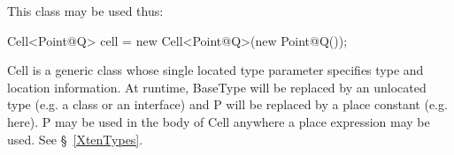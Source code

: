 This class may be used thus:

\begin{x10}
Cell<Point@Q> cell = 
   new Cell<Point@Q>(new Point@Q());
\end{x10}

{\cf Cell} is a generic class whose single located type parameter
specifies type and location information. At runtime, {\cf BaseType}
will be replaced by an unlocated type (e.g.{} a class or an interface)
and {\cf P} will be replaced by a place constant (e.g. {\cf
here}). {\cf P} may be used in the body of {\cf Cell} anywhere a place
expression may be used. See \S~\ref{XtenTypes}.

